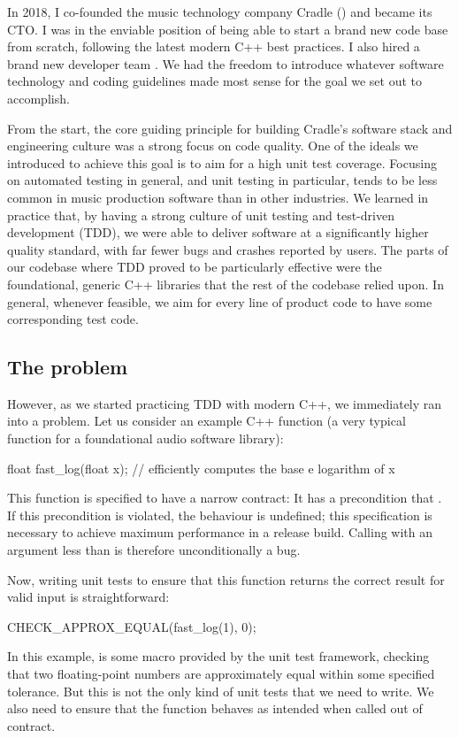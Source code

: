 In 2018, I co-founded the music technology company Cradle (\hyperref[https://cradle.app]{}) and became its CTO. I was in the enviable position of being able to start a brand new code base from scratch, following the latest modern C++ best practices. I also hired a brand new developer team . We had the freedom to introduce whatever software technology and coding guidelines made most sense for the goal we set out to accomplish.

From the start, the core guiding principle for building Cradle's software stack and engineering culture was a strong focus on code quality. One of the ideals we introduced to achieve this goal is to aim for a high unit test coverage. Focusing on automated testing in general, and unit testing in particular, tends to be less common in  music production software than in other industries. We learned in practice that, by having a strong culture of unit testing and test-driven development (TDD), we were able to deliver software at a significantly higher quality standard, with far fewer bugs and crashes reported by users. The parts of our codebase where TDD proved to be particularly effective were the foundational, generic C++ libraries that the rest of the codebase relied upon. In general, whenever feasible, we aim for every line of product code to have some corresponding test code.

\subsection{The problem}

However, as we started practicing TDD with modern C++, we immediately ran into a problem. Let us consider an example C++ function (a very typical function for a foundational audio software library):
\begin{codeblock}
float fast_log(float x);  // efficiently computes the base e logarithm of x
\end{codeblock}

This function is specified to have a narrow contract: It has a precondition that . If this precondition is violated, the behaviour is undefined; this specification is necessary to achieve maximum performance in a release build. Calling  with an argument less than  is therefore unconditionally a bug.

Now, writing unit tests to ensure that this function returns the correct result for valid input is straightforward:
\begin{codeblock}
CHECK_APPROX_EQUAL(fast_log(1), 0);
\end{codeblock}
In this example,  is some macro provided by the unit test framework, checking that two floating-point numbers are approximately equal within some specified tolerance. But this is not the only kind of unit tests that we need to write. We also need to ensure that the function behaves as intended when called out of contract.

